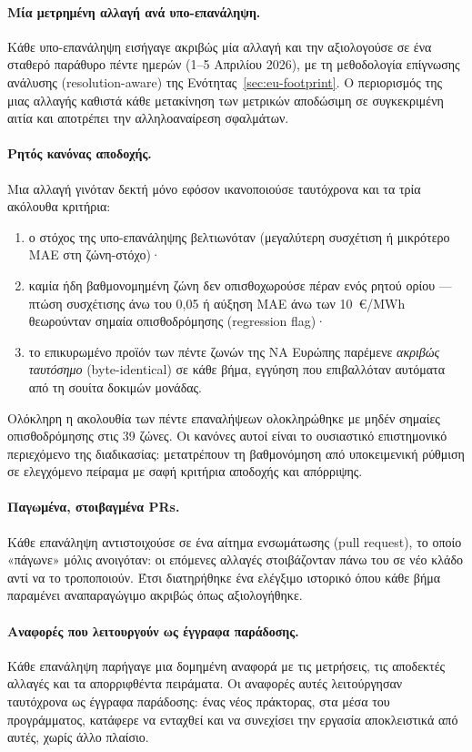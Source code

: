 \paragraph{Μία μετρημένη αλλαγή ανά υπο-επανάληψη.}
Κάθε υπο-επανάληψη εισήγαγε ακριβώς μία αλλαγή και την αξιολογούσε σε ένα σταθερό παράθυρο πέντε ημερών (1--5 Απριλίου 2026), με τη μεθοδολογία επίγνωσης ανάλυσης (resolution-aware) της Ενότητας~\ref{sec:eu-footprint}. Ο περιορισμός της μιας αλλαγής καθιστά κάθε μετακίνηση των μετρικών αποδώσιμη σε συγκεκριμένη αιτία και αποτρέπει την αλληλοαναίρεση σφαλμάτων.

\paragraph{Ρητός κανόνας αποδοχής.}
Μια αλλαγή γινόταν δεκτή μόνο εφόσον ικανοποιούσε ταυτόχρονα και τα τρία ακόλουθα κριτήρια:
\begin{enumerate}
\item ο στόχος της υπο-επανάληψης βελτιωνόταν (μεγαλύτερη συσχέτιση ή μικρότερο MAE στη ζώνη-στόχο)·
\item καμία ήδη βαθμονομημένη ζώνη δεν οπισθοχωρούσε πέραν ενός ρητού ορίου --- πτώση συσχέτισης άνω του 0,05 ή αύξηση MAE άνω των 10~€/MWh θεωρούνταν σημαία οπισθοδρόμησης (regression flag)·
\item το επικυρωμένο προϊόν των πέντε ζωνών της ΝΑ Ευρώπης παρέμενε \emph{ακριβώς ταυτόσημο} (byte-identical) σε κάθε βήμα, εγγύηση που επιβαλλόταν αυτόματα από τη σουίτα δοκιμών μονάδας.
\end{enumerate}
Ολόκληρη η ακολουθία των πέντε επαναλήψεων ολοκληρώθηκε με μηδέν σημαίες οπισθοδρόμησης στις 39 ζώνες. Οι κανόνες αυτοί είναι το ουσιαστικό επιστημονικό περιεχόμενο της διαδικασίας: μετατρέπουν τη βαθμονόμηση από υποκειμενική ρύθμιση σε ελεγχόμενο πείραμα με σαφή κριτήρια αποδοχής και απόρριψης.

\paragraph{Παγωμένα, στοιβαγμένα PRs.}
Κάθε επανάληψη αντιστοιχούσε σε ένα αίτημα ενσωμάτωσης (pull request), το οποίο «πάγωνε» μόλις ανοιγόταν: οι επόμενες αλλαγές στοιβάζονταν πάνω του σε νέο κλάδο αντί να το τροποποιούν. Έτσι διατηρήθηκε ένα ελέγξιμο ιστορικό όπου κάθε βήμα παραμένει αναπαραγώγιμο ακριβώς όπως αξιολογήθηκε.

\paragraph{Αναφορές που λειτουργούν ως έγγραφα παράδοσης.}
Κάθε επανάληψη παρήγαγε μια δομημένη αναφορά με τις μετρήσεις, τις αποδεκτές αλλαγές και τα απορριφθέντα πειράματα. Οι αναφορές αυτές λειτούργησαν ταυτόχρονα ως έγγραφα παράδοσης: ένας νέος πράκτορας, στα μέσα του προγράμματος, κατάφερε να ενταχθεί και να συνεχίσει την εργασία αποκλειστικά από αυτές, χωρίς άλλο πλαίσιο.

